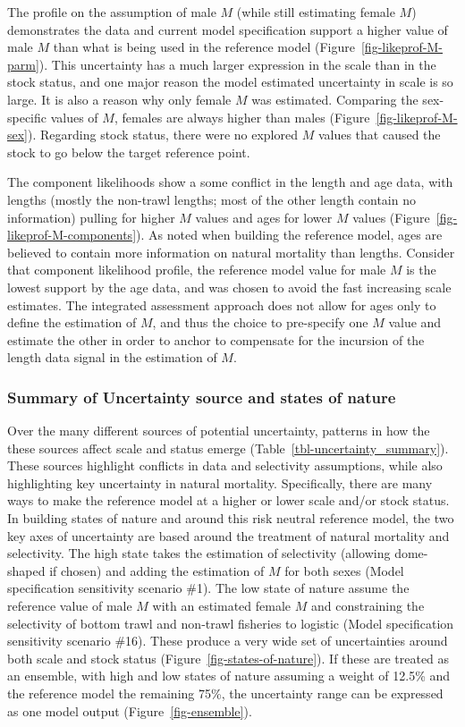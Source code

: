 \documentclass[
]{scrartcl}
\begin{document}
The profile on the assumption of male \(M\) (while still estimating
female \(M\)) demonstrates the data and current model specification
support a higher value of male \(M\) than what is being used in the
reference model (Figure~\ref{fig-likeprof-M-parm}). This uncertainty has
a much larger expression in the scale than in the stock status, and one
major reason the model estimated uncertainty in scale is so large. It is
also a reason why only female \(M\) was estimated. Comparing the
sex-specific values of \(M\), females are always higher than males
(Figure~\ref{fig-likeprof-M-sex}). Regarding stock status, there were no
explored \(M\) values that caused the stock to go below the target
reference point.

The component likelihoods show a some conflict in the length and age
data, with lengths (mostly the non-trawl lengths; most of the other
length contain no information) pulling for higher \(M\) values and ages
for lower \(M\) values (Figure~\ref{fig-likeprof-M-components}). As
noted when building the reference model, ages are believed to contain
more information on natural mortality than lengths. Consider that
component likelihood profile, the reference model value for male \(M\)
is the lowest support by the age data, and was chosen to avoid the fast
increasing scale estimates. The integrated assessment approach does not
allow for ages only to define the estimation of \(M\), and thus the
choice to pre-specify one \(M\) value and estimate the other in order to
anchor to compensate for the incursion of the length data signal in the
estimation of \(M\).

\subsubsection{Summary of Uncertainty source and states of
nature}\label{summary-of-uncertainty-source-and-states-of-nature}

Over the many different sources of potential uncertainty, patterns in
how the these sources affect scale and status emerge
(Table~\ref{tbl-uncertainty_summary}). These sources highlight conflicts
in data and selectivity assumptions, while also highlighting key
uncertainty in natural mortality. Specifically, there are many ways to
make the reference model at a higher or lower scale and/or stock status.
In building states of nature and around this risk neutral reference
model, the two key axes of uncertainty are based around the treatment of
natural mortality and selectivity. The high state takes the estimation
of selectivity (allowing dome-shaped if chosen) and adding the
estimation of \(M\) for both sexes (Model specification sensitivity
scenario \#1). The low state of nature assume the reference value of
male \(M\) with an estimated female \(M\) and constraining the
selectivity of bottom trawl and non-trawl fisheries to logistic (Model
specification sensitivity scenario \#16). These produce a very wide set
of uncertainties around both scale and stock status
(Figure~\ref{fig-states-of-nature}). If these are treated as an
ensemble, with high and low states of nature assuming a weight of 12.5\%
and the reference model the remaining 75\%, the uncertainty range can be
expressed as one model output (Figure~\ref{fig-ensemble}).
\end{document}
